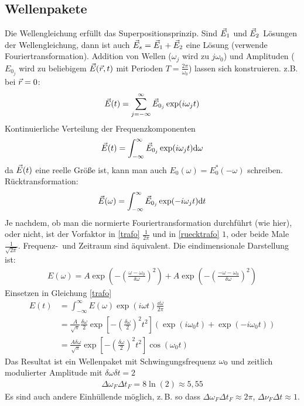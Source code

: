 \subsection{Wellenpakete}
Die Wellengleichung erfüllt das Superpositionsprinzip. Sind $\vec{E}_1$
und $\vec{E}_2$ Lösungen der Wellengleichung, dann ist auch
$\vec{E}_s=\vec{E}_1+\vec{E}_2$ eine Lösung (verwende
Fouriertransformation). 
Addition von Wellen ($\omega_j$ wird zu $j\omega_0$) und Amplituden
($E_{0_j}$ wird zu beliebigem $\vec{E}(\vec{r},t)$ mit Perioden $T=\frac{2\pi}{\omega_0}$) lassen sich konstruieren. z.B. bei $\vec{r}=0$:
\begin{gather*}
  \vec{E}(t)= \sum_{j=-\infty}^{\infty}
  \vec{E}_{0_j}\exp(i\omega_j t)
\end{gather*}
Kontinuierliche Verteilung der Frequenzkomponenten
\begin{gather}
  \vec{E}(t)= \int_{-\infty}^{\infty}\vec{E}_{0_j}\exp(i\omega_j t)\mathrm{d} \omega
  \label{trafo}
\end{gather}
da $\vec{E}(t)$ eine reelle Größe ist, kann man auch $E_0(\omega)=
E_0^*(-\omega)$ schreiben. Rücktransformation:
\begin{gather}
  \vec{E}(\omega) = \int_{-\infty}^{\infty}\vec{E}_{0_j}\exp(-i\omega_j
  t)\mathrm{d} t
  \label{ruecktrafo}
\end{gather}
Je nachdem, ob man die normierte Fouriertransformation durchführt (wie
hier), oder nicht, ist der Vorfaktor in \eqref{trafo} $\frac{1}{2\pi}$ und
in \eqref{ruecktrafo} $1$, oder beide Male $\frac{1}{\sqrt{2\pi}}$.
Frequenz-~und Zeitraum sind äquivalent. Die eindimensionale
Darstellung ist:
\begin{align}
  E(\omega) = A\exp\left(-\left(
  \frac{\omega-\omega_0}{\delta \omega}
  \right)^2\right)
  + A \exp\left(-\left(
  \frac{-\omega-\omega_0}{\delta \omega}
  \right)^2\right)
\end{align}
Einsetzen in Gleichung \eqref{trafo}
\begin{align*}
  E(t)&= \int_{-\infty}^{\infty} 
        E(\omega)\exp(i\omega t) \frac{\dd\omega}{2\pi}\\
      &= \frac{A}{\sqrt{\pi}}\frac{\delta\omega}{2}\exp\left[
        -\left( \frac{\delta\omega}{2} \right)^2 t^2
        \right]
        \left( \exp(i\omega_0 t) + \exp(-i\omega_0 t) \right)\\
      &=\frac{A\delta\omega}{\sqrt{\pi}}
        \exp\left[
        -\left(\frac{\delta\omega}{2}\right)^2 t^2
        \right]
        \cos(\omega_0t)
\end{align*}
Das Resultat ist ein Wellenpaket mit Schwingungsfrequenz $\omega_0$ und
zeitlich modulierter Amplitude mit $\delta\omega\delta t=2$ 
\begin{align*}
  \Delta\omega_F\Delta t_F=8\ln(2)\approx5,55
\end{align*}
Es sind auch andere Einhüllende möglich, z.\,B. so dass $\Delta\omega_F\Delta
t_F\approx2\pi$, $\Delta\nu_F\Delta t\approx 1$.

